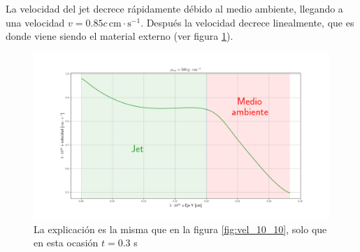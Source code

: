 \documentclass[12pt,a4paper]{book}
\begin{document}
La velocidad del jet decrece rápidamente débido al medio ambiente, llegando a una velocidad  $v = 0.85 c \, \mathrm{cm} \cdot \mathrm{s}^{-1}$. Después la velocidad decrece linealmente, que es donde viene siendo el material externo (ver figura \ref{fig:vel_500}).

\begin{figure}
\centering
\includegraphics[scale=0.3]{./Figuras/velocidades_jet_capitulo4/vel_500}
\caption{\label{fig:vel_500} La explicación es la misma que en la figura \ref{fig:vel_10_10}, solo que en esta ocasión $t = 0.3$ s}
\end{figure}

%
%
%
%
\end{document}
